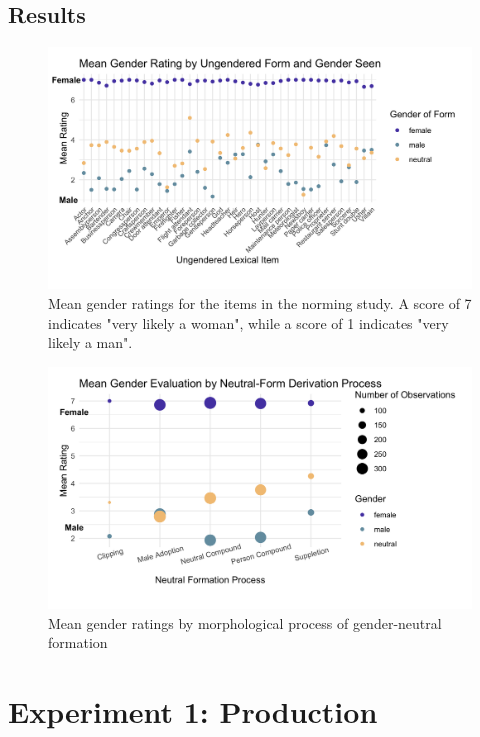 \documentclass{article}
\begin{document}
	\subsection{Results}
	
	\begin{figure}[h!]
		\centering
		\includegraphics[scale=0.2]{norming_values.png}
		\caption{Mean gender ratings for the items in the norming study. A score of 7 indicates "very likely a woman", while a score of 1 indicates "very likely a man".}
	\end{figure}
	
	\begin{figure}[h!]
		\centering
		\includegraphics[scale=0.2]{norming_deriv.png}
		\caption{Mean gender ratings by morphological process of gender-neutral formation}
	\end{figure}
	
	\newpage
	\section{Experiment 1: Production}
	
\end{document}
